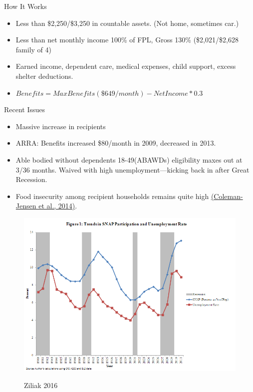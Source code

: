 \documentclass{beamer}
\begin{document}
\begin{frame}{How It Works}
\begin{itemize}
\item Less than \$2,250/\$3,250 in countable assets. (Not home, sometimes car.)
\item Less than net monthly income 100\% of FPL, Gross 130\% (\$2,021/\$2,628 family of 4)
\item Earned income, dependent care, medical expenses, child support, excess shelter deductions.
\item $ Benefits=MaxBenefits(\$649/month)-NetIncome*0.3 $
\end{itemize}
\end{frame}



\begin{frame}{Recent Issues}
\begin{itemize}
\item Massive increase in recipients
\item ARRA: Benefits increased \$80/month in 2009, decreased in 2013.
\item Able bodied without dependents 18-49(ABAWDs) eligibility maxes out at 3/36 months. Waived with high unemployment---kicking back in after Great Recession.
\item Food insecurity among recipient households remains quite high \href{http://www.ers.usda.gov/media/1896841/err194.pdf}{(Coleman-Jensen et al., 2014)}.
\end{itemize}
\end{frame}

\begin{frame}
\begin{figure}
\includegraphics[width=\textwidth]{./images/Ziliak.PNG}

Ziliak 2016
\end{figure}
\end{frame}
\end{document}

